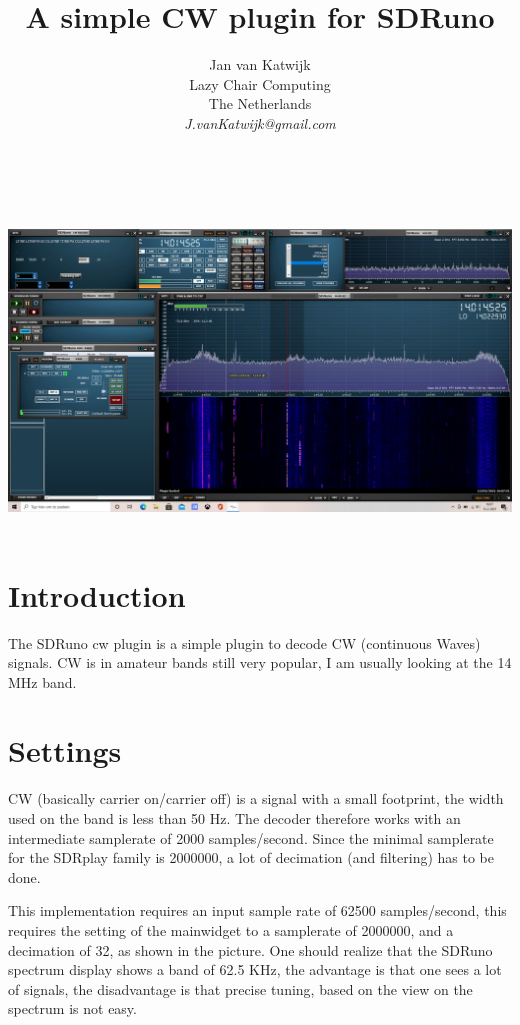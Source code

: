 \documentclass[11pt]{article}
\begin{document}
\title{A simple CW plugin for SDRuno}
\author{
Jan van Katwijk\\
Lazy Chair Computing \\
The Netherlands\\
{\em J.vanKatwijk@gmail.com}}
\maketitle
\ \\
\ \\
\includegraphics[width=140mm]{cw-example.png}
\ \\
\section{Introduction}
The SDRuno cw plugin is a simple plugin to decode CW (continuous Waves) signals.
CW is in amateur bands still very popular, I am usually looking at the
14 MHz band. 

\section{Settings}
CW (basically carrier on/carrier off) is a signal with a small footprint,
the width used on  the band is less than 50 Hz.
The decoder therefore works with an intermediate
samplerate of 2000 samples/second. Since the minimal samplerate for the
SDRplay family is 2000000, a lot of decimation (and filtering) has to be done.
\par
This implementation requires an input sample rate of 62500 samples/second,
this requires the setting of the mainwidget to a samplerate of 2000000,
and a decimation of 32, as shown in the picture.
One should realize that the SDRuno spectrum display shows a band of 62.5
KHz, the advantage is that one sees a lot of signals, the disadvantage
is that precise tuning, based on the view on the spectrum is not easy.
\end{document}
